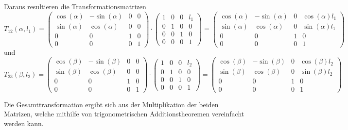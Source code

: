 Daraus resultieren die Transformationsmatrizen
\begin{equation*}
	T_{12}(\alpha, l_1) = \begin{pmatrix}
	\cos(\alpha) & -\sin(\alpha) & 0 & 0 \\
	\sin(\alpha) & \cos(\alpha) & 0 & 0 \\
	0 & 0 & 1 & 0 \\
	0 & 0 & 0 & 1
	\end{pmatrix} \cdot \begin{pmatrix}
	1 & 0 & 0 & l_1 \\
	0 & 1 & 0 & 0 \\
	0 & 0 & 1 & 0 \\
	0 & 0 & 0 & 1
	\end{pmatrix} = \begin{pmatrix}
	\cos(\alpha) & -\sin(\alpha) & 0 & \cos(\alpha) l_1 \\
	\sin(\alpha) & \cos(\alpha) & 0 & \sin(\alpha) l_1 \\
	0 & 0 & 1 & 0 \\
	0 & 0 & 0 & 1
	\end{pmatrix}
\end{equation*}
und
\begin{equation*}
	T_{23}(\beta, l_2) = \begin{pmatrix}
	\cos(\beta) & -\sin(\beta) & 0 & 0 \\
	\sin(\beta) & \cos(\beta) & 0 & 0 \\
	0 & 0 & 1 & 0 \\
	0 & 0 & 0 & 1
	\end{pmatrix} \cdot \begin{pmatrix}
	1 & 0 & 0 & l_2 \\
	0 & 1 & 0 & 0 \\
	0 & 0 & 1 & 0 \\
	0 & 0 & 0 & 1
	\end{pmatrix} = \begin{pmatrix}
	\cos(\beta) & -\sin(\beta) & 0 & \cos(\beta) l_2 \\
	\sin(\beta) & \cos(\beta) & 0 & \sin(\beta) l_2 \\
	0 & 0 & 1 & 0 \\
	0 & 0 & 0 & 1
	\end{pmatrix}
\end{equation*}

Die Gesamttransformation ergibt sich aus der Multiplikation der beiden Matrizen, welche mithilfe von trigonometrischen Additionstheoremen vereinfacht werden kann.

